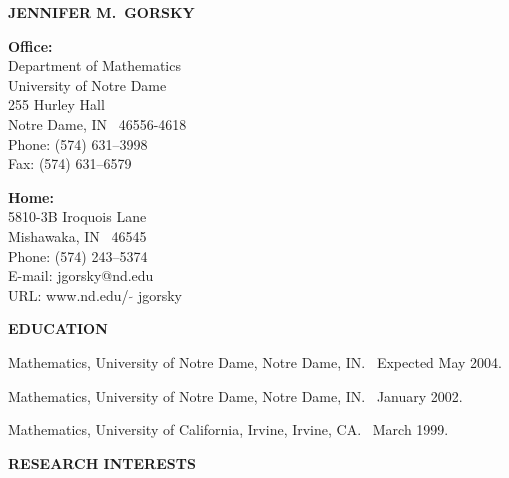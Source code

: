 \documentclass[11pt]{article}
\begin{document}

\newcommand{\bld}{\bf}
\newcommand{\reg}{\normalsize}
\newcommand{\bigbld}{\LARGE\bf}


\centerline{\bigbld JENNIFER M.\ GORSKY}
\vspace{0.3in}

\reg
\parbox[t]{4.75in}
     { {\bld Office:} \\
       Department of Mathematics \\
       University of Notre Dame \\
							255 Hurley Hall\\
       Notre Dame, IN \ 46556-4618 \\
       Phone: (574) 631--3998 \\
       Fax: (574) 631--6579 \\
       
     }
\parbox[t]{2.25in}
     { {\bld Home:} \\
       5810-3B Iroquois Lane \\
       Mishawaka, IN \ 46545 \\
       Phone: (574) 243--5374 \\
							E-mail: jgorsky@nd.edu\\
							URL: www.nd.edu/\,$\widetilde{\,\,}$\,jgorsky 
     }

\vspace{0.3in}
{\bld EDUCATION}

\vspace{0.1in}
\parbox[t]{0.5in}{\hspace{1in}}
\parbox[t]{6.5in}
     { 
       \parbox[t]{5.9in}
       { Mathematics, University of Notre Dame, Notre Dame, IN.
         \ Expected May 2004.}

       \vspace{0.1in}
       \parbox[t]{5.9in}
       { Mathematics, University of Notre Dame, Notre Dame, IN. \ January
2002.}

       \vspace{0.1in}
       \parbox[t]{5.9in}
       { Mathematics, University of California, Irvine, Irvine, CA. \  March
1999. }
     }



\vspace{0.3in}
{\bld RESEARCH INTERESTS}
\end{document}

